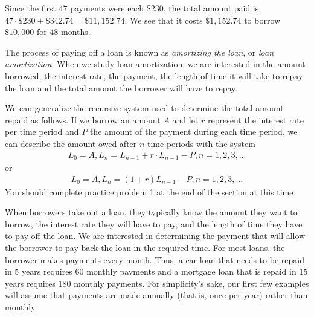 \documentclass[10pt,]{book}
\theoremstyle{plain}
\theoremstyle{definition}
\theoremstyle{definition}
\theoremstyle{definition}
\numberwithin{equation}{section}
\begin{document}
\hypertarget{p-41}{}%
Since the first \(47\) payments were each \(\$230\), the total amount paid is \(47\cdot \$230 + \$342.74 = \$11,152.74\).  We see that it costs \(\$1,152.74\) to borrow \(\$10,000\) for \(48\) months.%
\par
\hypertarget{p-42}{}%
The process of paying off a loan is known as \emph{amortizing the loan}, or \emph{loan amortization}. When we study loan amortization, we are interested in the amount borrowed, the interest rate, the payment, the length of time it will take to repay the loan and the total amount the borrower will have to repay.%
\par
\hypertarget{p-43}{}%
We can generalize the recursive system used to determine the total amount repaid as follows.  If we borrow an amount \(A\) and let \(r\) represent the interest rate per time period and \(P\) the amount of the payment during each time period, we can describe the amount owed after \(n\) time periods with the system%
%
\begin{gather*}
L_0=A, L_n=L_{n-1} + r \cdot L_{n-1} - P , n=1,2,3,...
\end{gather*}
\hypertarget{p-44}{}%
or%
%
\begin{gather}
L_0=A,L_n=(1+r)L_{n-1} - P , n=1,2,3,...\label{recursive-loan-equation}
\end{gather}
\hypertarget{p-45}{}%
You should complete practice problem 1 at the end of the section at this time%
\par
\hypertarget{p-46}{}%
When borrowers take out a loan, they typically know the amount they want to borrow, the interest rate they will have to pay, and the length of time they have to pay off the loan.  We are interested in determining the payment that will allow the borrower to pay back the loan in the required time.  For most loans, the borrower makes payments every month. Thus, a car loan that needs to be repaid in \(5\) years requires \(60\) monthly payments and a mortgage loan that is repaid in \(15\) years requires \(180\) monthly payments. For simplicity's sake, our first few examples will assume that payments are made annually (that is, once per year) rather than monthly.%
\end{document}
